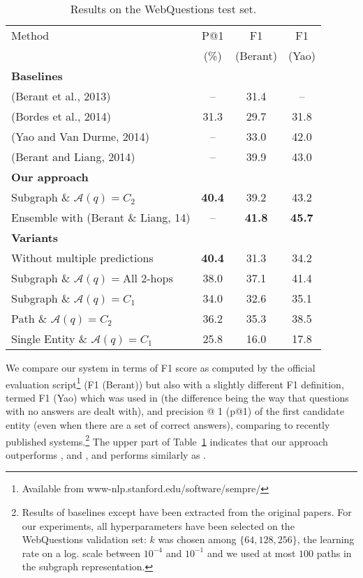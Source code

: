 \documentclass[runningheads,a4paper]{llncs}
\newcommand{\wq}{{\sc WebQuestions}\xspace}
\newcommand{\us}{Our approach}
\begin{document}
\begin{table}[t!]
\begin{center}
\begin{tabular}{|@{\,\,}l@{\,}|c|@{}c@{}|c|}
\hline
Method & P@1 & F1 & F1\\
& (\%) & (Berant) & (Yao)\\
\hline
{\bf Baselines} &&&\\
(Berant et al., 2013) \cite{berant-EtAl:2013:EMNLP} & -- & 31.4 & -- \\
(Bordes et al., 2014) \cite{bordes2014open} &  31.3 & 29.7 & 31.8 \\
(Yao and Van Durme, 2014)  \cite{yao2014information} & -- & 33.0 & 42.0\\
(Berant and Liang, 2014) \cite{berant2014semantic} & -- & 39.9 & 43.0\\
\hline
{\bf \us} & & & \\
Subgraph \& $\mathcal{A}(q)=C_2$  & \bf 40.4 & 39.2 & 43.2\\
Ensemble with (Berant \& Liang, 14) & -- &\bf 41.8 &\bf 45.7\\
\hline
{\bf Variants} & & & \\
Without multiple predictions  &\bf  40.4 & 31.3 & 34.2 \\
Subgraph \& $\mathcal{A}(q)=\mbox{All 2-hops}$ & 38.0 & 37.1 & 41.4\\
Subgraph \&  $\mathcal{A}(q)=C_1$ & 34.0 & 32.6 & 35.1\\
Path  \& $\mathcal{A}(q)=C_2$ & 36.2 & 35.3 & 38.5\\
Single Entity  \& $\mathcal{A}(q)=C_1$ & 25.8 & 16.0 & 17.8\\
\hline
\end{tabular}
\caption{\label{tab:res} Results on the \wq test set.}
\end{center}
\end{table}







We compare our system in terms of F1 score as computed by the official
evaluation script\footnote{Available from
  www-nlp.stanford.edu/software/sempre/} (F1 (Berant)) but also with a
slightly different F1 definition, termed F1 (Yao) which was used in
\cite{yao2014information} (the difference being the way that questions
with no answers are dealt with), and precision @ 1 (p@1) of the first
candidate entity (even when there are a set of correct answers),
comparing to recently published systems.\footnote{Results of baselines
  except \cite{bordes2014open} have been extracted from the original
  papers. For our experiments, all hyperparameters have been selected
  on the \wq validation set: $k$ was chosen among $\{64, 128, 256\}$,
  the learning rate on a log. scale between $10^{-4}$ and $10^{-1}$
  and we used at most $100$ paths in the subgraph representation.}
The upper part of Table~\ref{tab:res} indicates that our approach
outperforms \cite{yao2014information},
\cite{berant-EtAl:2013:EMNLP} and \cite{bordes2014open}, and performs
similarly as \cite{berant2014semantic}.
\end{document}
